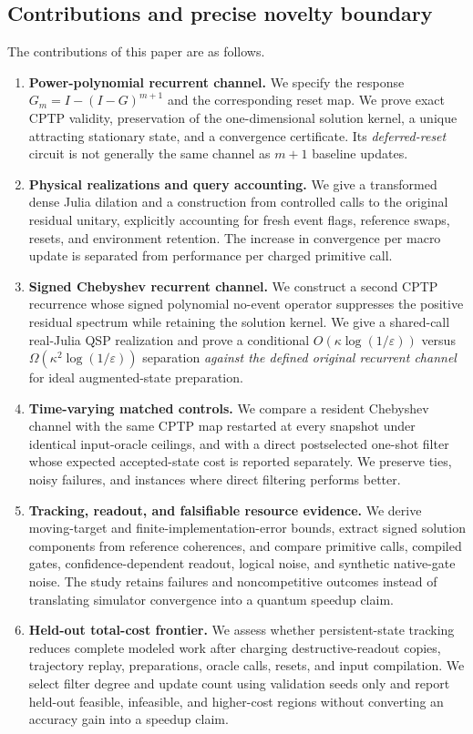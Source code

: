\documentclass{ieeeaccess}
\newcommand{\eps}{\varepsilon}\newcommand{\tr}{\mathsf T}
\begin{document}
\subsection{Contributions and precise novelty boundary}
The contributions of this paper are as follows.
\begin{enumerate}
\item \textbf{Power-polynomial recurrent channel.} We specify the response $G_m=I-(I-G)^{m+1}$ and the corresponding reset map. We prove exact CPTP validity, preservation of the one-dimensional solution kernel, a unique attracting stationary state, and a convergence certificate. Its \emph{deferred-reset} circuit is not generally the same channel as $m+1$ baseline updates.
\item \textbf{Physical realizations and query accounting.} We give a transformed dense Julia dilation and a construction from controlled calls to the original residual unitary, explicitly accounting for fresh event flags, reference swaps, resets, and environment retention. The increase in convergence per macro update is separated from performance per charged primitive call.
\item \textbf{Signed Chebyshev recurrent channel.} We construct a second CPTP recurrence whose signed polynomial no-event operator suppresses the positive residual spectrum while retaining the solution kernel. We give a shared-call real-Julia QSP realization and prove a conditional $O(\kappa\log(1/\eps))$ versus $\Omega(\kappa^2\log(1/\eps))$ separation \emph{against the defined original recurrent channel} for ideal augmented-state preparation.
\item \textbf{Time-varying matched controls.} We compare a resident Chebyshev channel with the same CPTP map restarted at every snapshot under identical input-oracle ceilings, and with a direct postselected one-shot filter whose expected accepted-state cost is reported separately. We preserve ties, noisy failures, and instances where direct filtering performs better.
\item \textbf{Tracking, readout, and falsifiable resource evidence.} We derive moving-target and finite-implementation-error bounds, extract signed solution components from reference coherences, and compare primitive calls, compiled gates, confidence-dependent readout, logical noise, and synthetic native-gate noise. The study retains failures and noncompetitive outcomes instead of translating simulator convergence into a quantum speedup claim.
\item \textbf{Held-out total-cost frontier.} We assess whether persistent-state tracking reduces complete modeled work after charging destructive-readout copies, trajectory replay, preparations, oracle calls, resets, and input compilation. We select filter degree and update count using validation seeds only and report held-out feasible, infeasible, and higher-cost regions without converting an accuracy gain into a speedup claim.
\end{enumerate}
\end{document}
